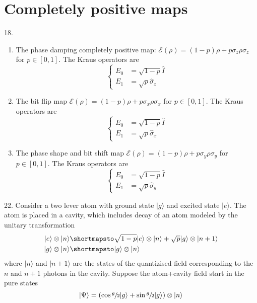 \documentclass[12pt]{book}
\theoremstyle{definition}
\let\mapsto\shortmapsto
\newcommand{\mapsto}{\longmapsto}
\newcommand{\si}{\sigma}
\newcommand{\para}[1]{\left( {#1} \right)}
\newcommand{\ket}[1]{\vert {#1} \rangle}
\begin{document}
\section{Completely positive maps}
18. \begin{enumerate}[label = (\alph*)]
  \item The phase damping completely positive map: $\mathcal E(\rho) = (1-p)\rho + p \si_z \rho \si_z$ for $p \in [0, 1]$. The Kraus operators are
  \begin{equation*}
    \begin{cases}
      E_0 & = \sqrt{1 - p} \hat I \\
      E_1 & = \sqrt{p} \hat \si_z
    \end{cases}
  \end{equation*}
  \item The bit flip map $\mathcal E(\rho) = (1-p)\rho + p \si_x \rho\si_x$ for $p\in [0, 1]$. The Kraus operators are
  \begin{equation*}
    \begin{cases}
      E_0 & = \sqrt{1 - p} \hat I \\
      E_1 & = \sqrt{p} \hat \si_x
    \end{cases}
  \end{equation*}
  \item The phase shape and bit shift map $\mathcal E(\rho) = (1-p)\rho + p \si_y \rho\si_y$ for $p\in [0, 1]$. The Kraus operators are
  \begin{equation*}
    \begin{cases}
      E_0 & = \sqrt{1 - p} \hat I \\
      E_1 & = \sqrt{p} \hat \si_y
    \end{cases}
  \end{equation*}
\end{enumerate}
22. Consider a two lever atom with ground state $\ket{g}$ and excited state $\ket{e}$. The atom is placed in a cavity, which includes decay of an atom modeled by the unitary transformation
\begin{align*}
  \ket{e} \otimes \ket{n} & \mapsto \sqrt{1 - p} \ket{e} \otimes\ket{n} + \sqrt{p} \ket{g} \otimes \ket{n+1}\\
  \ket{g} \otimes \ket{n} & \mapsto \ket{g} \otimes \ket{n}
\end{align*}
where $\ket{n}$ and $\ket{n+1}$ are the states of the quantizised field corresponding to the $n$ and $n+1$ photons in the cavity. Suppose the atom+cavity field start in the pure states
\begin{equation*}
  \ket{\Psi} = \para{\cos \sfrac \theta 2 \ket{g} + \sin \sfrac \theta 2 \ket{g}} \otimes \ket{n}
\end{equation*}
\end{document}
